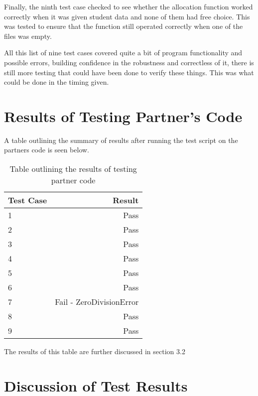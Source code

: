 \documentclass[12pt]{article}
\begin{document}
Finally, the ninth test case checked to see whether the allocation function worked 
correctly when it was given student data and none of them had free choice. This was
tested to ensure that the function still operated correctly when one of the files
was empty.

All this list of nine test cases covered quite a bit of program functionality and
possible errors, building confidence in the robustness and correctless of it, 
there is still more testing that could have been done to verify these things. This
was what could be done in the timing given.



\section{Results of Testing Partner's Code}

A table outlining the summary of results after running the test script on the
partners code is seen below.

\begin{table}[h]
	\centering
	\begin{tabular}{lr}
		\toprule
		Test Case & Result\\
		\midrule
		1 & Pass\\
		2 & Pass\\
		3 & Pass\\
		4 & Pass\\
		5 & Pass\\
		6 & Pass\\
		7 & Fail - ZeroDivisionError\\
		8 & Pass\\
		9 & Pass\\
		\bottomrule
	\end{tabular}
	\caption{Table outlining the results of testing partner code}
	\label{Table:Table 1}
\end{table}

The results of this table are further discussed in section 3.2


\section{Discussion of Test Results}
\end{document}
